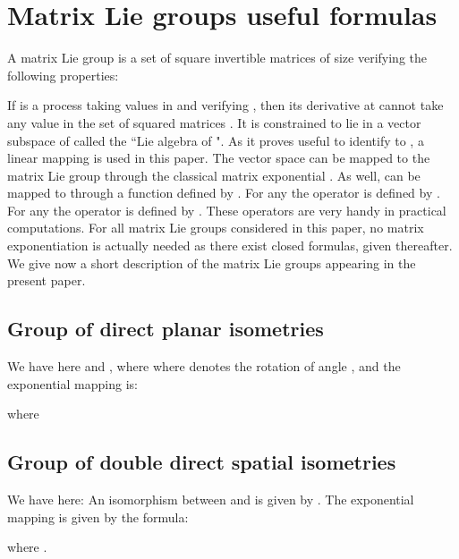 \documentclass[a4paper,12pt,onecolumn]{article}
\begin{document}
\appendix


 \section{Matrix Lie groups useful formulas}
\label{sect::tuto_Lie_groups}

A matrix Lie group  is a set of square invertible matrices of size  verifying the following properties:


If  is a process taking values in  and verifying , then its derivative at  cannot take any value in the set of squared matrices . It is constrained to lie in a vector subspace  of  called the ``Lie algebra of ". As it proves useful to identify  to , a linear mapping  is used in this paper. The vector space  can be mapped to the matrix Lie group  through the classical matrix exponential . As well,  can be mapped to  through a function  defined by . For any  the operator  is defined by . For any  the operator  is defined by . These operators are very handy in practical computations. For all matrix Lie groups considered in this paper, no matrix exponentiation is actually needed as there exist closed formulas, given thereafter. We give now a short description of the matrix Lie groups appearing in the present paper.

\subsection{Group of direct planar isometries }
\label{sect::tuto_SE2}

We have here  and , where    where
 denotes the rotation of angle , and the exponential mapping is:

where


\subsection{Group of double direct spatial isometries }
\label{sect::tuto_SE23}

We have here:   An isomorphism between  and  is given by . The exponential mapping is given by the formula:

where  .
\end{document}
